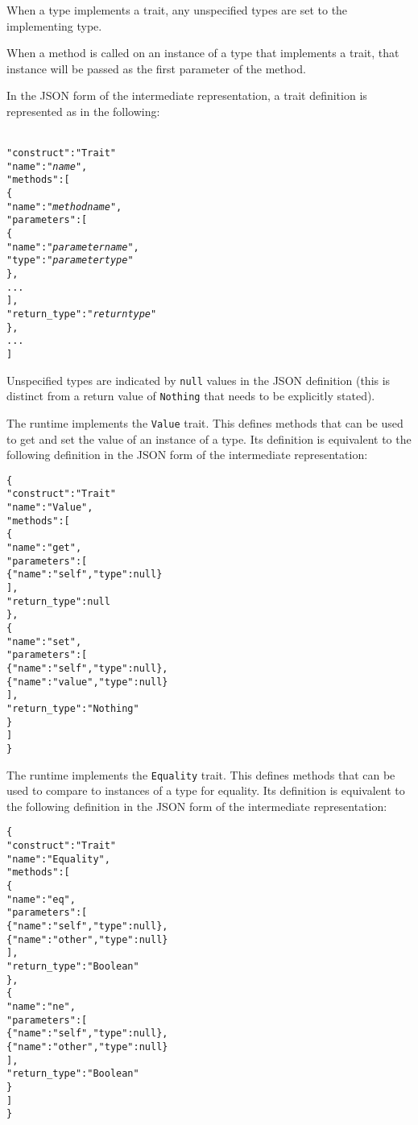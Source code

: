 \documentclass[10pt,twocolumn,a4paper]{article}
\newcommand{\code}[1]{\texttt{#1}}
\begin{document}
When a type implements a trait, any unspecified types are set to the
implementing type.

When a method is called on an instance of a type that implements a trait,
that instance will be passed as the first parameter of the method.

In the JSON form of the intermediate representation, a trait definition is
represented as in the following:
\footnotesize
\begin{alltt}
  {
    "construct"   : "Trait"
    "name"        : "\emph{name}",
    "methods"     : [
      \{
        "name"       : "\emph{method name}",
        "parameters" : [
          \{
            "name" : "\emph{parameter name}",
            "type" : "\emph{parameter type}"
          \},
          ...
        ],
        "return\_type" : "\emph{return type}"
      \},
      ...
    ]
  }
\end{alltt}
\normalsize
Unspecified types are indicated by \code{null} values in the JSON definition
(this is distinct from a return value of \code{Nothing} that needs to be
explicitly stated).

The runtime implements the \code{Value} trait. This defines methods
that can be used to get and set the value of an instance of a type. 
Its definition is equivalent to the following definition in the JSON
form of the intermediate representation:
\footnotesize
\begin{alltt}
  \{
    "construct" : "Trait"
    "name"      : "Value",
    "methods"   : [
      \{
        "name"        : "get",
        "parameters"  : [
          \{"name" : "self",  "type"   : null\}
        ],
        "return\_type" : null
      \},
      \{
        "name"        : "set",
        "parameters"  : [
          \{"name" : "self",  "type"   : null\},
          \{"name" : "value", "type"   : null\}
        ],
        "return\_type" : "Nothing"
      \}
    ]
  \}
\end{alltt}
\normalsize

The runtime implements the \code{Equality} trait. This defines methods that
can be used to compare to instances of a type for equality.
Its definition is equivalent to the following definition in the JSON
form of the intermediate representation:
\footnotesize
\begin{alltt}
  \{
    "construct" : "Trait"
    "name"      : "Equality",
    "methods"   : [
      \{
        "name"        : "eq",
        "parameters"  : [
          \{"name" : "self",  "type"   : null\},
          \{"name" : "other", "type"   : null\}
        ],
        "return\_type" : "Boolean"
      \},
      \{
        "name"        : "ne",
        "parameters"  : [
          \{"name" : "self",  "type"   : null\},
          \{"name" : "other", "type"   : null\}
        ],
        "return\_type" : "Boolean"
      \}
    ]
  \}
\end{alltt}
\normalsize
\end{document}
